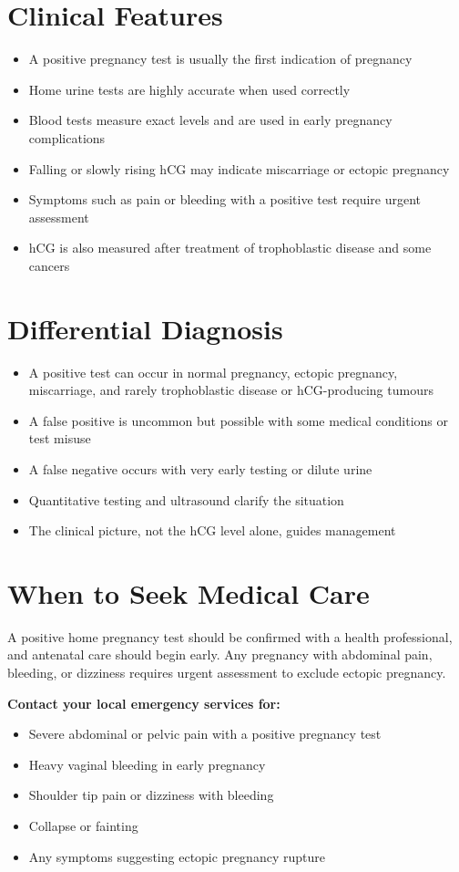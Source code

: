 \section*{Clinical Features}
\begin{itemize}
    \item A positive pregnancy test is usually the first indication of pregnancy
    \item Home urine tests are highly accurate when used correctly
    \item Blood tests measure exact levels and are used in early pregnancy complications
    \item Falling or slowly rising hCG may indicate miscarriage or ectopic pregnancy
    \item Symptoms such as pain or bleeding with a positive test require urgent assessment
    \item hCG is also measured after treatment of trophoblastic disease and some cancers
\end{itemize}

\section*{Differential Diagnosis}
\begin{itemize}
    \item A positive test can occur in normal pregnancy, ectopic pregnancy, miscarriage, and rarely trophoblastic disease or hCG-producing tumours
    \item A false positive is uncommon but possible with some medical conditions or test misuse
    \item A false negative occurs with very early testing or dilute urine
    \item Quantitative testing and ultrasound clarify the situation
    \item The clinical picture, not the hCG level alone, guides management
\end{itemize}

\section*{When to Seek Medical Care}
A positive home pregnancy test should be confirmed with a health professional, and antenatal care should begin early. Any pregnancy with abdominal pain, bleeding, or dizziness requires urgent assessment to exclude ectopic pregnancy.

\textbf{Contact your local emergency services for:}
\begin{itemize}
    \item Severe abdominal or pelvic pain with a positive pregnancy test
    \item Heavy vaginal bleeding in early pregnancy
    \item Shoulder tip pain or dizziness with bleeding
    \item Collapse or fainting
    \item Any symptoms suggesting ectopic pregnancy rupture
\end{itemize}

